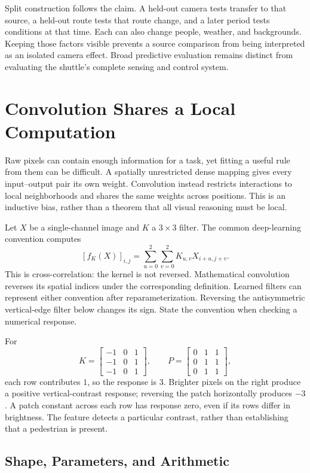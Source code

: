 Split construction follows the claim. A held-out camera tests transfer to that source, a held-out route tests that route change, and a later period tests conditions at that time. Each can also change people, weather, and backgrounds. Keeping those factors visible prevents a source comparison from being interpreted as an isolated camera effect. Broad predictive evaluation remains distinct from evaluating the shuttle's complete sensing and control system.

\section{Convolution Shares a Local Computation}

Raw pixels can contain enough information for a task, yet fitting a useful rule from them can be difficult. A spatially unrestricted dense mapping gives every input--output pair its own weight. Convolution instead restricts interactions to local neighborhoods and shares the same weights across positions. This is an inductive bias, rather than a theorem that all visual reasoning must be local.

Let $X$ be a single-channel image and $K$ a $3\times3$ filter. The common deep-learning convention computes
\[
[f_K(X)]_{i,j}=\sum_{u=0}^2\sum_{v=0}^2K_{u,v}X_{i+u,j+v}.
\]
This is cross-correlation: the kernel is not reversed. Mathematical convolution reverses its spatial indices under the corresponding definition. Learned filters can represent either convention after reparameterization. Reversing the antisymmetric vertical-edge filter below changes its sign. State the convention when checking a numerical response.

For
\[
K=\begin{bmatrix}-1&0&1\\-1&0&1\\-1&0&1\end{bmatrix},\qquad
P=\begin{bmatrix}0&1&1\\0&1&1\\0&1&1\end{bmatrix},
\]
each row contributes $1$, so the response is $3$. Brighter pixels on the right produce a positive vertical-contrast response; reversing the patch horizontally produces $-3$. A patch constant across each row has response zero, even if its rows differ in brightness. The feature detects a particular contrast, rather than establishing that a pedestrian is present.

\subsection{Shape, Parameters, and Arithmetic}

